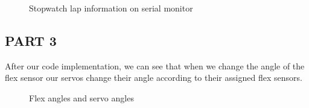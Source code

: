 \documentclass[pdftex,12pt,a4paper]{article}
\begin{document}
\begin{figure}[H]
    \centering
    \centering
    \caption{Stopwatch lap information on serial monitor}
    \label{fig:part2-right-simulation2}
\end{figure}


\newpage{}
\begin{flushleft}
\subsection{PART 3}
After our code implementation, we can see that when we change the angle of the flex sensor our servos change their angle according to their assigned flex sensors. 
\begin{figure}[H]
    \centering
    \centering

    \caption{Flex angles and servo angles}
    \label{fig:Flex angles and servo angles}
\end{figure}

\end{flushleft}
\end{document}
